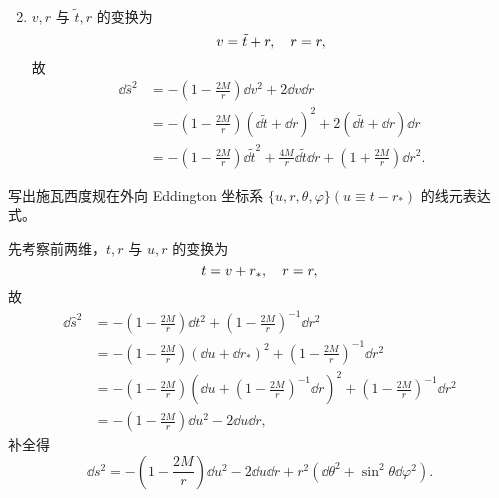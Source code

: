\begin{xiti}
\begin{zm}
\begin{enumerate}
\begin{align*}
				\end{align*}
			\item $v, r$ 与 $\tilde{t}, r$ 的变换为
				\begin{equation*}
					v = \tilde{t} + r \qc r =r,
				\end{equation*}
				故
				\begin{align*}
					\dd \hat{s}^2 &= - \left( 1 - \frac{2M}{r} \right) \dd{v}^2 + 2 \dd{v} \dd{r}\\
					&= - \left( 1 - \frac{2M}{r} \right) \left( \dd{\tilde{t}} + \dd{r} \right)^2 + 2 \left( \dd{\tilde{t}} + \dd{r} \right) \dd{r}\\
					&= - \left( 1 - \frac{2M}{r} \right) \dd{\tilde{t}}^2 + \frac{4M}{r} \dd{\tilde{t}} \dd{r} + \left( 1 + \frac{2M}{r} \right) \dd{r}^2.
				\end{align*}
		\end{enumerate}
	\end{zm}

	\item 写出施瓦西度规在外向 Eddington 坐标系 $\{ u,r, \theta, \varphi \}(u \equiv t - r_*)$ 的线元表达式。

	\begin{jie}
		先考察前两维，$t,r$ 与 $u,r$ 的变换为
		\begin{equation*}
			t = v + r_* \qc r = r,
		\end{equation*}
		故
		\begin{align*}
			\dd \hat{s}^2 &= - \left( 1 - \frac{2M}{r} \right) \dd t^2 + \left( 1 - \frac{2M}{r} \right)^{-1} \dd{r}^2\\
			&= - \left( 1 - \frac{2M}{r} \right) \left( \dd{u} + \dd{r_*} \right)^2 + \left( 1 - \frac{2M}{r} \right)^{-1} \dd{r}^2\\
			&= - \left( 1 - \frac{2M}{r} \right) \left( \dd{u} + \left( 1 - \frac{2M}{r} \right)^{-1} \dd{r} \right)^2 + \left( 1 - \frac{2M}{r} \right)^{-1} \dd{r}^2\\
			&= - \left( 1 - \frac{2M}{r} \right) \dd{u}^2 - 2 \dd{u} \dd{r},
		\end{align*}
		补全得
		\begin{equation*}
			\dd s^2 = - \left( 1 - \frac{2M}{r} \right) \dd{u}^2 - 2 \dd{u} \dd{r} + r^2 \left( \dd{\theta}^2 + \sin^2 \theta \dd{\varphi}^2 \right).
		\end{equation*}
	\end{jie}


\end{xiti}
